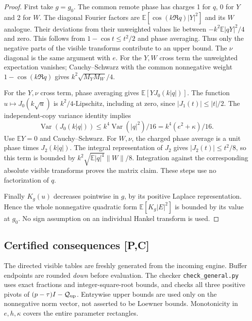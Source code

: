 \begin{proof}
First take $g=g_0$. The common remote phase has charges
1 for $q$, 0 for $Y$ and 2 for $W$. The diagonal Fourier
factors are $\mathbb E[\cos(k\Re q)|Y|^2]$ and its $W$
analogue. Their deviations from their unweighted values lie
between $-k^2\mathbb E|qY|^2/4$ and zero. This follows from
$1-\cos t\le t^2/2$ and phase averaging. Thus only the
negative parts of the visible transforms contribute to an
upper bound. The $\nu$ diagonal is the same argument with $e$.
For the $Y,W$ cross term the unweighted expectation vanishes;
Cauchy--Schwarz with the common nonnegative weight
$1-\cos(k\Re q)$ gives $k^2\sqrt{M_YM_W}/4$.

For the $Y,\nu$ cross term, phase averaging gives
$\mathbb E[YJ_0(k|q|)]$. The function
$u\mapsto J_0(k\sqrt u)$ is $k^2/4$-Lipschitz, including at
zero, since $|J_1(t)|\le |t|/2$. The independent-copy
variance identity implies
\[
 \operatorname{Var}(J_0(k|q|))
 \le k^4\operatorname{Var}(|q|^2)/16
 = k^4(e^2+\kappa)/16.
\]
Use $\mathbb EY=0$ and Cauchy--Schwarz.
For $W,\nu$, the charged phase average is a unit phase times
$J_2(k|q|)$. The integral representation of $J_2$ gives
$|J_2(t)|\le t^2/8$, so this term is bounded by
$k^2\sqrt{\mathbb E|q|^4}\|W\|/8$.
Integration against the corresponding absolute visible transforms
proves the matrix claim. These steps use no factorization of $q$.

Finally $K_g(u)$ decreases pointwise in $g$, by its positive
Laplace representation. Hence the whole nonnegative quadratic
form $\mathbb E[K_g|E|^2]$ is bounded by its value at $g_0$.
No sign assumption on an individual Hankel transform is used.
\end{proof}

\subsection{Certified consequences [P,C]}
The directed visible tables are freshly generated from the incoming
engine. Buffer endpoints are rounded \emph{down} before evaluation.
The checker \texttt{check\_general.py} uses exact fractions and
integer-square-root bounds, and checks all three positive pivots of
$(p-\tau)I-\mathcal Q_{\rm up}$. Entrywise upper bounds are used
only on the nonnegative norm vector, not asserted to be Loewner bounds.
Monotonicity in $e,h,\kappa$ covers the entire parameter rectangles.

